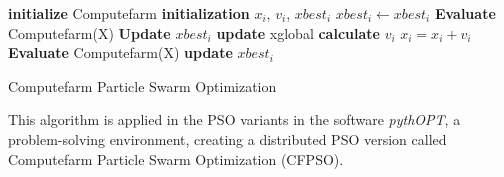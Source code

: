 \begin{algorithm}[H]
  \begin{algorithmic}[2]

      \State \textbf{initialize} Computefarm 
        \State \textbf{initialization} $x_i$, $v_i$, $xbest_i$ 
        $xbest_i \gets xbest_i$
    \EndFor
    \State \textbf{Evaluate} Computefarm(X) 
        \State \textbf{Update} $xbest_i$ 
    \EndFor
            \State \textbf{update} xglobal 
            \State \textbf{calculate} $v_i$ 
            \State $x_i = x_i + v_i$
        \EndFor
        \State \textbf{Evaluate} Computefarm(X)
            \State \textbf{update} $xbest_i$
        \EndFor
    \EndWhile
  \end{algorithmic}
\caption{Computefarm Particle Swarm Optimization}
\label{CFPSO}
\end{algorithm}
 
This algorithm is applied in the PSO variants in the software \textit{pythOPT}, a problem-solving environment, creating a distributed PSO version called Computefarm Particle Swarm Optimization (CFPSO).

